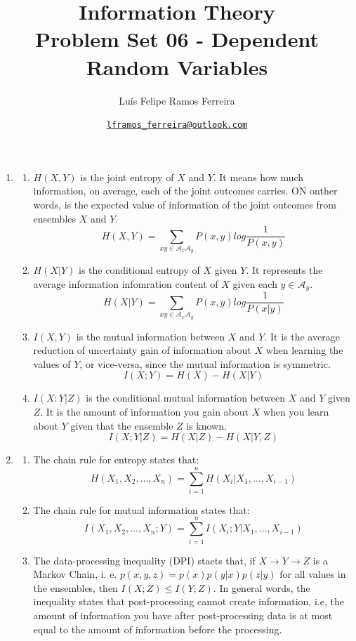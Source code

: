 \documentclass{article}
\title{Information Theory \\ \large Problem Set 06 - Dependent Random Variables}
\author{Luís Felipe Ramos Ferreira}
\date{\href{mailto:lframos\_ferreira@outlook.com}{\texttt{lframos\_ferreira@outlook.com}}
}
\begin{document}
\maketitle

\begin{enumerate}
	\item \begin{enumerate}
		      \item \(H(X, Y)\) is the joint entropy of \(X\) and \(Y\). It means how much information, on average, each of the joint outcomes carries. ON onther words, is the expected value of information of the joint outcomes from ensembles \(X\) and \(Y\).
		            \[H(X, Y) = \sum_{xy \in \mathcal{A}_x\mathcal{A}_y} P(x, y) log \frac{1}{P(x, y)}\]
		      \item \(H(X | Y)\) is the conditional entropy of \(X\) given \(Y\). It represents the average information infomration content of \(X\) given each \(y \in \mathcal{A}_y\).
		            \[H(X | Y) = \sum_{xy \in \mathcal{A}_x\mathcal{A}_y} P(x, y) log \frac{1}{P(x | y)}\]
		      \item \(I(X, Y)\) is the mutual information between \(X\) and \(Y\). It is the average reduction of uncertainty gain of information about \(X\) when learning the values of \(Y\), or vice-versa, since the mutual information is symmetric.
		            \[I(X; Y) = H(X) - H(X | Y) \]
		      \item \(I(X: Y | Z)\) is the conditional mutual information between \(X\) and \(Y\) given \(Z\). It is the amount of information you gain about \(X\) when you learn about \(Y\) given that the ensemble \(Z\) is known.
		            \[I(X; Y | Z) = H(X | Z) - H(X | Y, Z)\]
	      \end{enumerate}

	\item \begin{enumerate}
		      \item The chain rule for entropy states that:
		            \[H(X_1, X_2, \dots, X_n) = \sum_{i=1}^{n} H(X_i | X_1, \dots, X_{i-1})\]
		      \item The chain rule for mutual information states that:
		            \[I(X_1, X_2, \dots, X_n; Y) = \sum_{i=1}^{n} I(X_i; Y | X_1, \dots, X_{i-1})\]
		      \item The data-processing inequality (DPI) staets that, if \(X \rightarrow Y \rightarrow Z\) is a Markov Chain, i. e. \(p(x, y, z) = p(x) p(y | x) p(z | y)\) for all values in the ensembles, then \(I(X;Z) \leq I(Y;Z)\).
		            In general words, the inequality states that post-processing cannot create information, i.e, the amount of information you have after post-processing data is at most equal to the amount of information before the processing.
	      \end{enumerate}


\end{enumerate}
\end{document}
